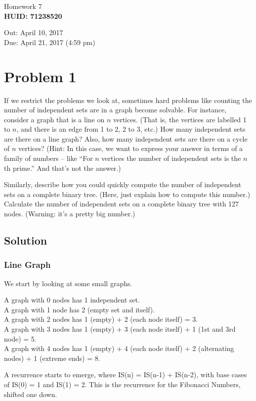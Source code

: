 \documentclass[11pt]{article}
\begin{document}
\begin{center} Homework 7 \\
\textbf{HUID: 71238520}
\end{center}
\begin{flushright}
Out: April 10, 2017\\
Due: April 21, 2017 (4:59 pm)
\end{flushright}

\section{Problem 1}
If we restrict the problems we look at, sometimes hard problems like counting the number of independent sets are in a graph become solvable. For instance, consider a graph that is a line on $n$ vertices. (That is, the vertices are labelled 1 to $n$, and there is an edge from 1 to 2, 2 to 3, etc.) How many independent sets are there on a line graph? Also, how many independent sets are there on a cycle of $n$ vertices? (Hint: In this case, we want to express your answer in terms of a family of numbers – like “For $n$ vertices the number of independent sets is the $n$th prime.” And that’s not the answer.)

Similarly, describe how you could quickly compute the number of independent sets on a complete binary tree. (Here, just explain how to compute this number.) Calculate the number of independent sets on a complete binary tree with 127 nodes. (Warning: it’s a pretty big number.)
\subsection{Solution}

\subsubsection{Line Graph}
We start by looking at some small graphs. 

A graph with 0 nodes has 1 independent set.\\
A graph with 1 node has 2 (empty set and itself). \\
A graph with 2 nodes has 1 (empty) + 2 (each node itself) = 3. \\
A graph with 3 nodes has 1 (empty) + 3 (each node itself) + 1 (1st and 3rd node) = 5.\\
A graph with 4 nodes has 1 (empty) + 4 (each node itself) + 2 (alternating nodes) + 1 (extreme ends) = 8.

A recurrence starts to emerge, where IS(n) = IS(n-1) + IS(n-2), with base cases of IS(0) = 1 and IS(1) = 2. This is the recurrence for the Fibonacci Numbers, shifted one down. 
\end{document}
